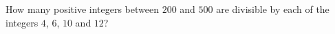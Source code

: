 How many positive integers between $200$ and $500$ are divisible by each of the integers $4$, $6$, $10$ and $12$?
